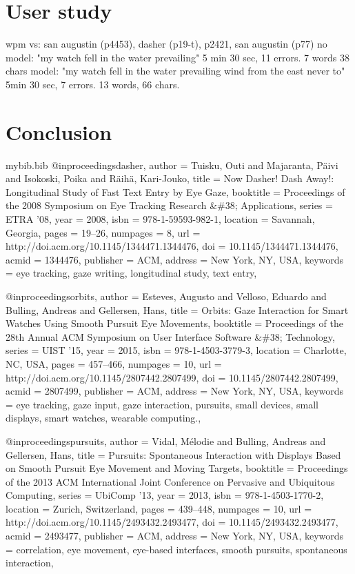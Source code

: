 \documentclass[a4paper, titlepage]{article}
\renewcommand{\%}{\scalebox{.9}{\oldpct}}
\begin{document}
\section{User study}
wpm vs: san augustin (p4453), dasher (p19-t), p2421, san augustin (p77)
no model: "my watch fell in the water prevailing" 5 min 30 sec, 11 errors.
7 words 38 chars
model: "my watch fell in the water prevailing wind from the east never to" 5min
30 sec, 7 errors. 13 words, 66 chars.

\section{Conclusion}


\begin{filecontents}{mybib.bib}
@inproceedings{dasher,
 author = {Tuisku, Outi and Majaranta, P\"{a}ivi and Isokoski, Poika and R\"{a}ih\"{a}, Kari-Jouko},
 title = {Now Dasher! Dash Away!: Longitudinal Study of Fast Text Entry by Eye Gaze},
 booktitle = {Proceedings of the 2008 Symposium on Eye Tracking Research \&\#38; Applications},
 series = {ETRA '08},
 year = {2008},
 isbn = {978-1-59593-982-1},
 location = {Savannah, Georgia},
 pages = {19--26},
 numpages = {8},
 url = {http://doi.acm.org/10.1145/1344471.1344476},
 doi = {10.1145/1344471.1344476},
 acmid = {1344476},
 publisher = {ACM},
 address = {New York, NY, USA},
 keywords = {eye tracking, gaze writing, longitudinal study, text entry},
} 

@inproceedings{orbits,
 author = {Esteves, Augusto and Velloso, Eduardo and Bulling, Andreas and Gellersen, Hans},
 title = {Orbits: Gaze Interaction for Smart Watches Using Smooth Pursuit Eye Movements},
 booktitle = {Proceedings of the 28th Annual ACM Symposium on User Interface Software \&\#38; Technology},
 series = {UIST '15},
 year = {2015},
 isbn = {978-1-4503-3779-3},
 location = {Charlotte, NC, USA},
 pages = {457--466},
 numpages = {10},
 url = {http://doi.acm.org/10.1145/2807442.2807499},
 doi = {10.1145/2807442.2807499},
 acmid = {2807499},
 publisher = {ACM},
 address = {New York, NY, USA},
 keywords = {eye tracking, gaze input, gaze interaction, pursuits, small devices, small displays, smart watches, wearable computing.},
}

@inproceedings{pursuits,
 author = {Vidal, M{\'e}lodie and Bulling, Andreas and Gellersen, Hans},
 title = {Pursuits: Spontaneous Interaction with Displays Based on Smooth Pursuit Eye Movement and Moving Targets},
 booktitle = {Proceedings of the 2013 ACM International Joint Conference on Pervasive and Ubiquitous Computing},
 series = {UbiComp '13},
 year = {2013},
 isbn = {978-1-4503-1770-2},
 location = {Zurich, Switzerland},
 pages = {439--448},
 numpages = {10},
 url = {http://doi.acm.org/10.1145/2493432.2493477},
 doi = {10.1145/2493432.2493477},
 acmid = {2493477},
 publisher = {ACM},
 address = {New York, NY, USA},
 keywords = {correlation, eye movement, eye-based interfaces, smooth pursuits, spontaneous interaction},
}


\end{filecontents}
\end{document}
